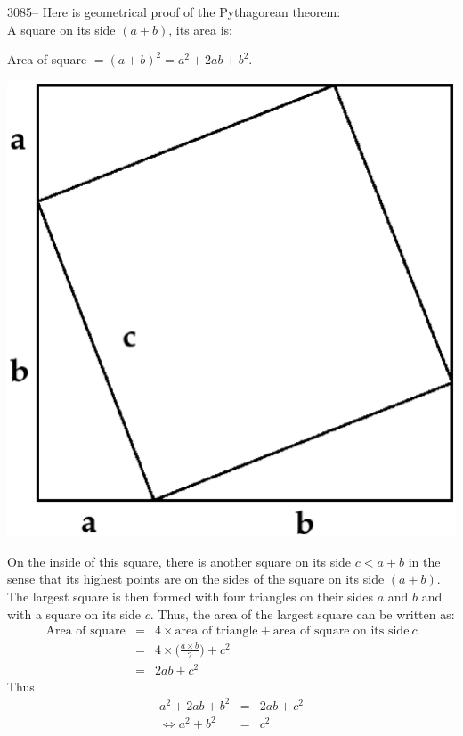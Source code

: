 \documentclass[letterpaper, 12pt]{article}
\begin{document}
3085-- Here is geometrical proof of the Pythagorean theorem:\\
A square on its side $(a+b)$, its area is:\\
\begin{center}
Area of square $ = (a+b)^{2} = a^{2} + 2ab + b^{2}$.
\end{center}
\begin{center}
\includegraphics[scale=0.3]{carrcarre.eps}
\end{center}
On the inside of this square, there is another square on its side $c < a+b$ in the sense that its highest points are on the sides of the square on its side $(a+b)$. The largest square is then formed with four triangles on their sides $a$ and $b$ and with a square on its side $c$.
Thus, the area of the largest square can be written as:\\
\begin{eqnarray*}
\textrm{Area of square} &=& 4 \times  \textrm{area of triangle} + \textrm{area of square on its side} \ c\\
&=& 4 \times  \Big( \frac{a\times b}{2} \Big) + c^{2}\\
&=& 2ab + c^{2}
\end{eqnarray*}
Thus
\begin{eqnarray*}
a^{2} + 2ab + b^{2} &=& 2ab + c^{2}\\
\Leftrightarrow a^{2} + b^{2} &=& c^{2}
\end{eqnarray*}
\end{document}
